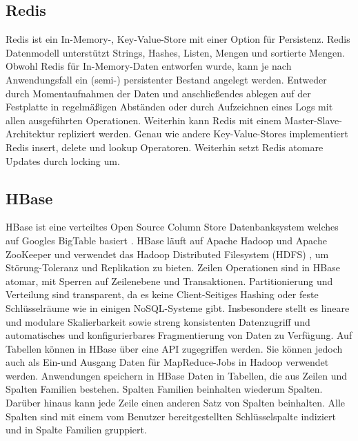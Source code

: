 \subsection{Redis}

Redis \cite{red2013} ist ein In-Memory-, Key-Value-Store mit einer Option für Persistenz. Redis Datenmodell unterstützt Strings, Hashes, Listen, Mengen und sortierte Mengen. Obwohl Redis für In-Memory-Daten entworfen wurde, kann je nach Anwendungsfall ein (semi-) persistenter Bestand angelegt werden. Entweder durch Momentaufnahmen der Daten und anschließendes ablegen auf der Festplatte in regelmäßigen Abständen oder durch Aufzeichnen eines Logs mit allen ausgeführten Operationen. Weiterhin kann Redis mit einem Master-Slave-Architektur repliziert werden. Genau wie andere Key-Value-Stores implementiert Redis insert, delete und lookup Operatoren. Weiterhin setzt Redis atomare Updates durch locking um. 

\subsection{HBase} 

HBase ist eine verteiltes Open Source Column Store Datenbanksystem welches auf Googles BigTable basiert \cite{Chang:2006:BDS:1267308.1267323}. HBase läuft auf Apache Hadoop und Apache ZooKeeper  \cite{Hunt:2010:ZWC:1855840.1855851} und verwendet das Hadoop Distributed Filesystem (HDFS) \cite{Shvachko:2010:HDF:1913798.1914427}, um Störung-Toleranz und Replikation zu bieten. Zeilen Operationen sind in HBase atomar, mit Sperren auf Zeilenebene und Transaktionen. Partitionierung und Verteilung sind transparent, da es keine Client-Seitiges Hashing oder feste Schlüsselräume wie in einigen NoSQL-Systeme gibt. 
Insbesondere stellt es lineare und modulare Skalierbarkeit sowie streng konsistenten Datenzugriff und automatisches und konfigurierbares Fragmentierung von Daten zu Verfügung. Auf Tabellen können in HBase über eine API zugegriffen werden. Sie können jedoch auch als Ein-und Ausgang Daten für MapReduce-Jobs in Hadoop verwendet werden. Anwendungen speichern in HBase Daten in Tabellen, die aus Zeilen und Spalten Familien bestehen. Spalten Familien beinhalten wiederum Spalten. Darüber hinaus kann jede Zeile einen anderen Satz von Spalten beinhalten. Alle Spalten sind mit einem vom Benutzer bereitgestellten Schlüsselspalte indiziert und in Spalte Familien gruppiert.

